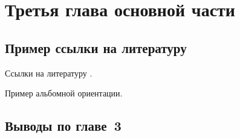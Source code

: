 \chapter{Третья глава основной части}\label{chap:3}

\section{Пример ссылки на литературу}

Ссылки на литературу \cite{NLPub,Ustalov:14}.

\begin{landscape}

Пример альбомной ориентации.

\end{landscape}

\section{Выводы по главе~3}
